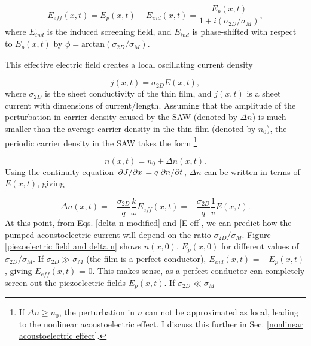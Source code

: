 \documentclass[double,12pt,1in]{beavtex}
\begin{document}
\begin{equation}
    E_{eff}(x,t) = E_p(x,t) + E_{ind}(x,t) = \frac{E_p(x,t)}{1+i(\sigma_{2D}/\sigma_M)}, \label{E eff}
\end{equation}
where $E_{ind}$ is the induced screening field, and $E_{ind}$ is phase-shifted with respect to $E_p(x,t)$ by $\phi = \mathrm{arctan}(\sigma_{2D}/\sigma_M)$.

This effective electric field creates a local oscillating current density

\begin{equation}
    j(x,t) = \sigma_{2D} E(x,t), \label{2D AE ohm's law}
\end{equation}
where $\sigma_{2D}$ is the sheet conductivity of the thin film, and $j(x,t)$ is a sheet current with dimensions of current/length. Assuming that the amplitude of the perturbation in carrier density caused by the SAW (denoted by $\Delta n$) is much smaller than the average carrier density in the thin film (denoted by $n_0$), the periodic carrier density in the SAW takes the form \footnote{If $\Delta n \geq n_0$, the perturbation in $n$ can not be approximated as local, leading to the nonlinear acoustoelectric effect. I discuss this further in Sec. \ref{nonlinear acoustoelectric effect}.}

\begin{equation}
    n(x,t) = n_0 + \Delta n(x,t). 
\end{equation}
Using the continuity equation $\pdv*{J}{x} = q \pdv*{n}{t}$, $\Delta n$ can be written in terms of $E(x,t)$, giving

\begin{equation}
    \Delta n(x,t) = -\frac{\sigma_{2D}}{q} \frac{k}{\omega} E_{eff}(x,t) = -\frac{\sigma_{2D}}{q} \frac{1}{v}E(x,t). \label{delta n modified}
\end{equation}
At this point, from Eqs. \ref{delta n modified} and \ref{E eff}, we can predict how the pumped acoustoelectric current will depend on the ratio $\sigma_{2D}/\sigma_M$. Figure \ref{piezoelectric field and delta n} shows $n(x,0)$, $E_p(x,0)$ for different values of $\sigma_{2D}/\sigma_M$. If $\sigma_{2D} \gg \sigma_M$ (the film is a perfect conductor), $E_{ind}(x,t)$ = $-E_p(x,t)$, giving $E_{eff}(x,t)$ = 0. This makes sense, as a perfect conductor can completely screen out the piezoelectric fields $E_p(x,t)$. If $\sigma_{2D} \ll \sigma_M$
\end{document}
